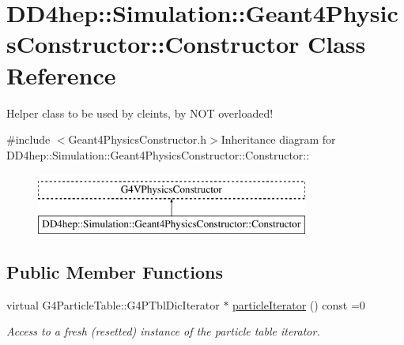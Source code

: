 \hypertarget{class_d_d4hep_1_1_simulation_1_1_geant4_physics_constructor_1_1_constructor}{
\section{DD4hep::Simulation::Geant4PhysicsConstructor::Constructor Class Reference}
\label{class_d_d4hep_1_1_simulation_1_1_geant4_physics_constructor_1_1_constructor}
}


Helper class to be used by cleints, by NOT overloaded!  


{\ttfamily \#include $<$Geant4PhysicsConstructor.h$>$}Inheritance diagram for DD4hep::Simulation::Geant4PhysicsConstructor::Constructor::\begin{figure}[H]
\begin{center}
\leavevmode
\includegraphics[height=2cm]{class_d_d4hep_1_1_simulation_1_1_geant4_physics_constructor_1_1_constructor}
\end{center}
\end{figure}
\subsection*{Public Member Functions}
\begin{DoxyCompactItemize}
\item 
virtual G4ParticleTable::G4PTblDicIterator $\ast$ \hyperlink{class_d_d4hep_1_1_simulation_1_1_geant4_physics_constructor_1_1_constructor_a53dfd498fc3e9a35224537d9706849d7}{particleIterator} () const =0
\begin{DoxyCompactList}\small\item\em Access to a fresh (resetted) instance of the particle table iterator. \item\end{DoxyCompactList}\end{DoxyCompactItemize}
